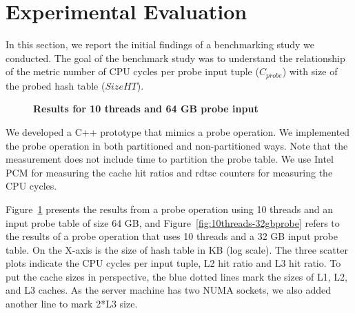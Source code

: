 \section{Experimental Evaluation}
In this section, we report the initial findings of a benchmarking study we conducted. 
The goal of the benchmark study was to understand the relationship of the metric number of CPU cycles per probe input tuple ($C_{probe}$) with size of the probed hash table ($SizeHT$).

\begin{figure}[t]
	\centering
	\vspace{-0.6em}
	\caption{\textbf{Results for 10 threads and 64 GB probe input}}
	\label{fig:10threads-64gbprobe}
	\vspace{-1em}
\end{figure}


We developed a C++ prototype that mimics a probe operation. 
We implemented the probe operation in both partitioned and non-partitioned ways.
Note that the measurement does not include time to partition the probe table. 
We use Intel PCM for measuring the cache hit ratios and rdtsc counters for measuring the CPU cycles. 

Figure~\ref{fig:10threads-64gbprobe} presents the results from a probe operation using 10 threads and an input probe table of size 64 GB, and Figure~\ref{fig:10threads-32gbprobe} refers to the results of a probe operation that uses 10 threads and a 32 GB input probe table. 
On the X-axis is the size of hash table in KB (log scale). 
The three scatter plots indicate the CPU cycles per input tuple, L2 hit ratio and L3 hit ratio. 
To put the cache sizes in perspective, the blue dotted lines mark the sizes of L1, L2, and L3 caches. 
As the server machine has two NUMA sockets, we also added another line to mark 2*L3 size. 

